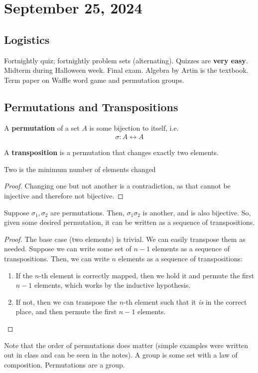 \section{September 25, 2024}

\subsection{Logistics}
Fortnightly quiz; fortnightly problem sets (alternating). Quizzes are \textbf{very easy}. Midterm during Halloween week. Final exam. Algebra by Artin is the textbook. Term paper on Waffle word game and permutation groups.

\subsection{Permutations and Transpositions}
\begin{definition}
    A \textbf{permutation} of a set $A$ is some bijection to itself, i.e.
    \begin{align}
        \sigma: A \longleftrightarrow A
    \end{align}
\end{definition}
\begin{definition}
    A \textbf{transposition} is a permutation that changes exactly two elements.
\end{definition}
\begin{lemma}
    Two is the minimum number of elements changed
\end{lemma}
\begin{proof}
    Changing one but not another is a contradiction, as that cannot be injective and therefore not bijective.
\end{proof}
\begin{lemma}
    Suppose $\sigma_1, \sigma_2$ are permutations. Then, $\sigma_1\sigma_2$ is another, and is also bijective. So, given some desired permutation, it can be written as a sequence of transpositions.
\end{lemma}
\begin{proof}
    The base case (two elements) is trivial. We can easily transpose them as needed. Suppose we can write some set of $n-1$ elements as a sequence of transpositions. Then, we can write $n$ elements as a sequence of transpositions:
    \begin{enumerate}
        \item If the $n$-th element is correctly mapped, then we hold it and permute the first $n-1$ elements, which works by the inductive hypothesis.
        \item If not, then we can transpose the $n$-th element such that it \textit{is} in the correct place, and then permute the first $n-1$ elements. \qedhere
    \end{enumerate}
\end{proof}
Note that the order of permutations does matter (simple examples were written out in class and can be seen in the notes). A group is some set with a law of composition. Permutations are a group.